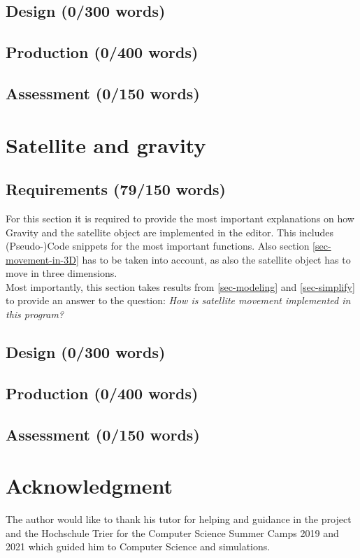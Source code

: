 \documentclass[conference,compsoc]{IEEEtran}
\begin{document}
\subsection{Design (0/300 words)}
\subsection{Production (0/400 words)}
\subsection{Assessment (0/150 words)}
\section{Satellite and gravity}
\label{sec-satellite-gravity}
\subsection{Requirements (79/150 words)}
For this section it is required to provide the most important explanations on how Gravity and the satellite object are implemented in the editor. This includes (Pseudo-)Code snippets for the most important functions. Also section \ref{sec-movement-in-3D} has to be taken into account, as also the satellite object has to move in three dimensions. \\
Most importantly, this section takes results from \ref{sec-modeling} and \ref{sec-simplify} to provide an answer to the question: \emph{How is satellite movement implemented in this program?}
\subsection{Design (0/300 words)}
\subsection{Production (0/400 words)}
\subsection{Assessment (0/150 words)}


\section*{Acknowledgment}
The author would like to thank his tutor for helping and guidance in the project and the Hochschule Trier for the Computer Science Summer Camps 2019 and 2021 which guided him to Computer Science and simulations.
\end{document}
